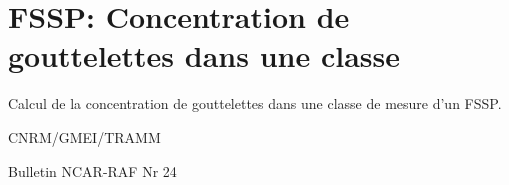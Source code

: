 %
\section{FSSP: Concentration de gouttelettes dans une classe}

 

Calcul de la concentration de gouttelettes dans une classe 
de mesure d'un FSSP.

\bigskip





CNRM/GMEI/TRAMM

Bulletin NCAR-RAF Nr 24 \cite{RAF-24}
